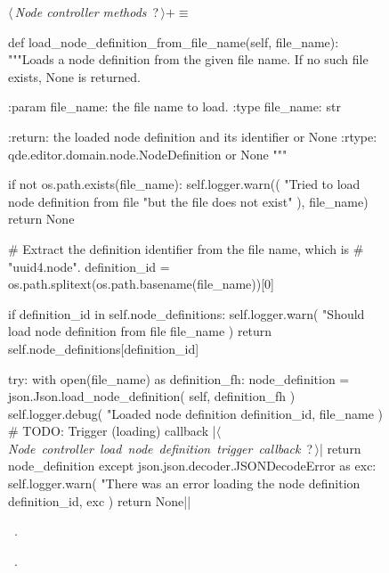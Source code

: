\documentclass[%
    a4paper,    %
    justified,  %
    nobib,      %
    openany     %
]{tufte-book}
\begin{document}
\begin{figure}
\begin{flushleft} \small
\begin{minipage}{\linewidth}\label{scrap124}\raggedright\small
{} $\langle\,${\itshape Node controller methods}\nobreak\ {\footnotesize {?}}$\,\rangle+\equiv$
\vspace{-1ex}
\begin{pythoncode}
def load_node_definition_from_file_name(self, file_name):
    """Loads a node definition from the given file name.
    If no such file exists, None is returned.

    :param file_name: the file name to load.
    :type  file_name: str

    :return: the loaded node definition and its identifier or None
    :rtype:  qde.editor.domain.node.NodeDefinition or None
    """

    if not os.path.exists(file_name):
        self.logger.warn((
            "Tried to load node definition from file %
            "but the file does not exist"
        ), file_name)
        return None

    # Extract the definition identifier from the file name, which is
    # "uuid4.node".
    definition_id = os.path.splitext(os.path.basename(file_name))[0]

    if definition_id in self.node_definitions:
        self.logger.warn(
            "Should load node definition from file %
            file_name
        )
        return self.node_definitions[definition_id]

    try:
        with open(file_name) as definition_fh:
            node_definition = json.Json.load_node_definition(
                self, definition_fh
            )
            self.logger.debug(
                "Loaded node definition %
                definition_id, file_name
            )
            # TODO: Trigger (loading) callback
            |\hbox{$\langle\,${\itshape Node controller load node definition trigger callback}\nobreak\ {\footnotesize ?}$\,\rangle$}|
            return node_definition
    except json.json.decoder.JSONDecodeError as exc:
        self.logger.warn(
            "There was an error loading the node definition %
            definition_id, exc
        )
        return None|\NWsep|
\end{pythoncode}
\vspace{1.5ex}
\footnotesize
\begin{list}{}{\setlength{\itemsep}{-\parsep}\setlength{\itemindent}{-\leftmargin}}
\item \NWtxtMacroDefBy\ .
\item \NWtxtMacroRefIn\ .


\end{list}
\end{minipage}
\end{flushleft}
\end{figure}
\end{document}
